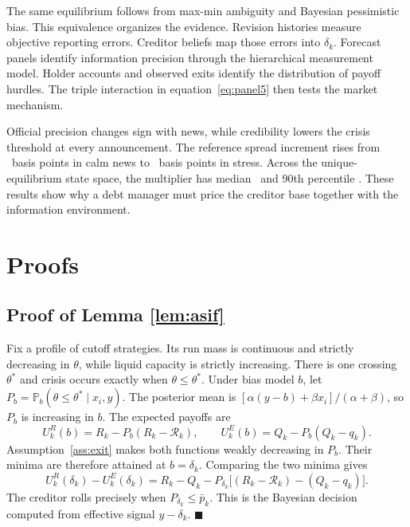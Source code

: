 \documentclass[11pt]{article}
\theoremstyle{definition}
\newcommand{\Prob}{\mathbb{P}}
\begin{document}
The same equilibrium follows from max-min ambiguity and Bayesian pessimistic bias. This equivalence organizes the evidence. Revision histories measure objective reporting errors. Creditor beliefs map those errors into $\delta_k$. Forecast panels identify information precision through the hierarchical measurement model. Holder accounts and observed exits identify the distribution of payoff hurdles. The triple interaction in equation~\eqref{eq:panel5} then tests the market mechanism.

Official precision changes sign with news, while credibility lowers the crisis threshold at every announcement. The reference spread increment rises from \PremCalm\ basis points in calm news to \PremStress\ basis points in stress. Across the unique-equilibrium state space, the multiplier has median \MultMedian\ and 90th percentile \MultPninety. These results show why a debt manager must price the creditor base together with the information environment.

\clearpage
\appendix
\renewcommand{\theequation}{\thesection.\arabic{equation}}

\section{Proofs}\label{app:proofs}

\subsection{Proof of Lemma \ref{lem:asif}}
Fix a profile of cutoff strategies. Its run mass is continuous and strictly decreasing in $\theta$, while liquid capacity is strictly increasing. There is one crossing $\theta^*$ and crisis occurs exactly when $\theta\leq\theta^*$. Under bias model $b$, let $P_b=\Prob_b(\theta\leq\theta^*\mid x_i,y)$. The posterior mean is $[\alpha(y-b)+\beta x_i]/(\alpha+\beta)$, so $P_b$ is increasing in $b$. The expected payoffs are
\[
U_k^R(b)=R_k-P_b(R_k-\mathcal R_k),
\qquad
U_k^E(b)=Q_k-P_b(Q_k-q_k).
\]
Assumption~\ref{ass:exit} makes both functions weakly decreasing in $P_b$. Their minima are therefore attained at $b=\delta_k$. Comparing the two minima gives
\[
U_k^R(\delta_k)-U_k^E(\delta_k)
=R_k-Q_k-P_{\delta_k}\big[(R_k-\mathcal R_k)-(Q_k-q_k)\big].
\]
The creditor rolls precisely when $P_{\delta_k}\leq\bar p_k$. This is the Bayesian decision computed from effective signal $y-\delta_k$. $\blacksquare$
\end{document}
